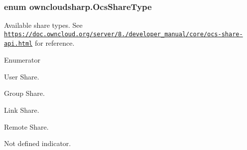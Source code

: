 \subsubsection[{Ocs\+Share\+Type}]{\setlength{\rightskip}{0pt plus 5cm}enum {\bf owncloudsharp.\+Ocs\+Share\+Type}\hspace{0.3cm}{\ttfamily [strong]}}\label{namespaceowncloudsharp_a51141c9a2e84eaced736ab96ea4b2f0b}


Available share types. See {\ttfamily \href{https://doc.owncloud.org/server/8.2/developer_manual/core/ocs-share-api.html}{\tt https\+://doc.\+owncloud.\+org/server/8./developer\+\_\+manual/core/ocs-\/share-\/api.\+html}} for reference. 

\begin{Desc}
\item[Enumerator]\par
\begin{description}
\item[{\em 
\hypertarget{namespaceowncloudsharp_a51141c9a2e84eaced736ab96ea4b2f0ba8f9bfe9d1345237cb3b2b205864da075}{}User\label{namespaceowncloudsharp_a51141c9a2e84eaced736ab96ea4b2f0ba8f9bfe9d1345237cb3b2b205864da075}
}]User Share. \item[{\em 
\hypertarget{namespaceowncloudsharp_a51141c9a2e84eaced736ab96ea4b2f0ba03937134cedab9078be39a77ee3a48a0}{}Group\label{namespaceowncloudsharp_a51141c9a2e84eaced736ab96ea4b2f0ba03937134cedab9078be39a77ee3a48a0}
}]Group Share. \item[{\em 
\hypertarget{namespaceowncloudsharp_a51141c9a2e84eaced736ab96ea4b2f0ba97e7c9a7d06eac006a28bf05467fcc8b}{}Link\label{namespaceowncloudsharp_a51141c9a2e84eaced736ab96ea4b2f0ba97e7c9a7d06eac006a28bf05467fcc8b}
}]Link Share. \item[{\em 
\hypertarget{namespaceowncloudsharp_a51141c9a2e84eaced736ab96ea4b2f0baf8508f576cd3f742dfc268258dcdf0dd}{}Remote\label{namespaceowncloudsharp_a51141c9a2e84eaced736ab96ea4b2f0baf8508f576cd3f742dfc268258dcdf0dd}
}]Remote Share. \item[{\em 
\hypertarget{namespaceowncloudsharp_a51141c9a2e84eaced736ab96ea4b2f0ba6adf97f83acf6453d4a6a4b1070f3754}{}None\label{namespaceowncloudsharp_a51141c9a2e84eaced736ab96ea4b2f0ba6adf97f83acf6453d4a6a4b1070f3754}
}]Not defined indicator. \end{description}
\end{Desc}
